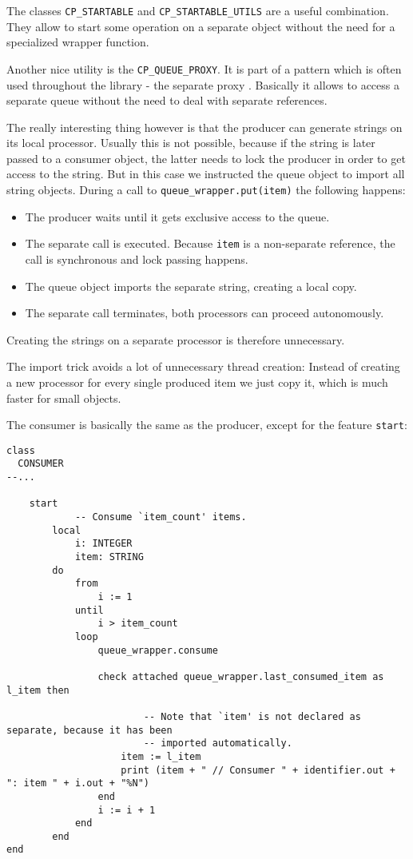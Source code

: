 \documentclass[a4paper,10pt]{report}
\begin{document}
The classes \lstinline!CP_STARTABLE! and \lstinline!CP_STARTABLE_UTILS! are a useful combination.
They allow to start some operation on a separate object without the need for a specialized wrapper function.

Another nice utility is the \lstinline!CP_QUEUE_PROXY!.
It is part of a pattern which is often used throughout the library - the separate proxy .
Basically it allows to access a separate queue without the need to deal with separate references.

The really interesting thing however is that the producer can generate strings on its local processor.
Usually this is not possible, because if the string is later passed to a consumer object, the latter needs to lock the producer in order to get access to the string.
But in this case we instructed the queue object to import all string objects. During a call to \lstinline!queue_wrapper.put(item)! the following happens:
\begin{itemize}
 \item The producer waits until it gets exclusive access to the queue.
 \item The separate call is executed. Because \lstinline!item! is a non-separate reference, the call is synchronous and lock passing happens.
 \item The queue object imports the separate string, creating a local copy.
 \item The separate call terminates, both processors can proceed autonomously.
\end{itemize}
Creating the strings on a separate processor is therefore unnecessary.

The import trick avoids a lot of unnecessary thread creation:
Instead of creating a new processor for every single produced item we just copy it, which is much faster for small objects.

The consumer is basically the same as the producer, except for the feature \lstinline!start!:

\begin{lstlisting}
class
  CONSUMER
--...
  
	start
			-- Consume `item_count' items.
		local
			i: INTEGER
			item: STRING
		do
			from
				i := 1
			until
				i > item_count
			loop
				queue_wrapper.consume

				check attached queue_wrapper.last_consumed_item as l_item then

						-- Note that `item' is not declared as separate, because it has been
						-- imported automatically.
					item := l_item
					print (item + " // Consumer " + identifier.out + ": item " + i.out + "%N")
				end
				i := i + 1
			end
		end
end
\end{lstlisting}
\end{document}
